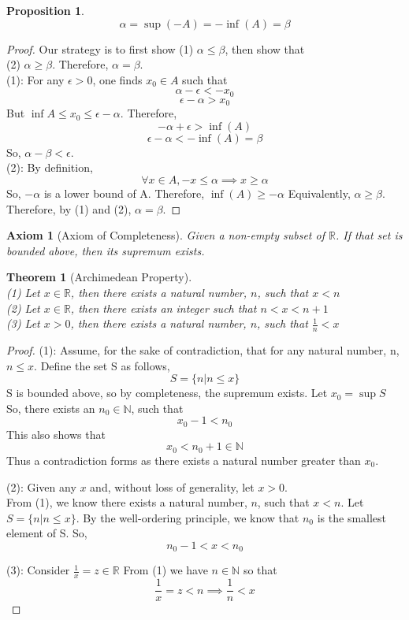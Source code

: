 \documentclass[12pt,reqno]{amsart}
\theoremstyle{plain}
\newtheorem{axiom}{Axiom}
\newtheorem{theorem}{Theorem}
\newtheorem{proposition}{Proposition}
\begin{document}
\begin{proposition}
    \[ \alpha = \sup{(-A)} = -\inf{(A)} = \beta \]
\end{proposition}
\begin{proof}
    Our strategy is to first show (1) $\alpha \le \beta$, then show that \\(2) $\alpha \ge \beta$. Therefore, $\alpha = \beta$. \\
    (1): For any $\epsilon > 0$, one finds $x_0 \in A$ such that
    \[ \alpha - \epsilon < -x_0\]
    \[ \epsilon - \alpha > x_0 \]
    But $\inf{A} \le x_0 \le \epsilon - \alpha$. Therefore,
    \[ -\alpha + \epsilon > \inf{(A)}\]
    \[ \epsilon - \alpha < -\inf{(A)} = \beta\]
    So, $\alpha - \beta < \epsilon$. \\
    (2): By definition,
    \[ \forall x \in A, -x \le \alpha \implies x \ge \alpha\]
    So, $-\alpha$ is a lower bound of A. Therefore, $\inf{(A)} \ge -\alpha$
    Equivalently, $\alpha \ge \beta$. \\
    Therefore, by (1) and (2), $\alpha = \beta$.
\end{proof}

\pagebreak

\begin{axiom}[Axiom of Completeness]
    Given a non-empty subset of $\mathbb{R}$. If that set is bounded above, then its supremum exists.
\end{axiom}

\begin{theorem}[Archimedean Property] \hfill \\
    (1) Let $x \in \mathbb{R}$, then there exists a natural number, $n$, such that $x < n$ \\
    (2) Let $x \in \mathbb{R}$, then there exists an integer such that $n < x < n+1$ \\
    (3) Let $x > 0$, then there exists a natural number, $n$, such that $\frac1n < x$
\end{theorem}

\begin{proof} \hfill
    
    (1): Assume, for the sake of contradiction, that for any natural number, n, $n \le x$.
    Define the set S as follows,
    \[ S = \{ n \vert n \le x \} \]
    S is bounded above, so by completeness, the supremum exists.
    Let $x_0 = \sup S$
    So, there exists an $n_0 \in \mathbb{N}$, such that 
    \[ x_0 - 1 < n_0 \]
    This also shows that 
    \[ x_0 < n_0 + 1 \in \mathbb{N} \]
    Thus a contradiction forms as there exists a natural number greater than $x_0$.
    
    (2): Given any $x$ and, without loss of generality, let $x > 0$. \\
    From (1), we know there exists a natural number, $n$, such that $x < n$.
    Let $S = \{ n \vert n \le x \}$. 
    By the well-ordering principle, we know that $n_0$ is the smallest element of S. 
    So,
    \[ n_0 - 1 < x < n_0 \]

    (3): Consider $\frac1x = z \in \mathbb{R}$
    From (1) we have $n \in \mathbb{N}$ so that 
    \[ \frac1x = z < n \implies \frac1n < x \] 
\end{proof}
\end{document}
